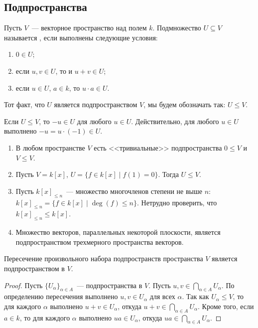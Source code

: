 \subsection{Подпространства}

\begin{definition}
Пусть $V$~--- векторное пространство над полем $k$.
Подмножество $U\subseteq V$ называется
, если выполнены следующие условия:
\begin{enumerate}
\item $0\in U$;
\item если $u,v\in U$, то и $u+v\in U$;
\item если $u\in U$, $a\in k$, то $u\cdot a\in U$.
\end{enumerate}
Тот факт, что $U$ является подпространством $V$, мы будем обозначать
так: $U\leq V$.
\end{definition}

\begin{remark}
Если $U\leq V$, то $-u\in U$ для любого $u\in
U$. Действительно, для любого $u\in U$
выполнено $-u = u\cdot (-1)\in U$.
\end{remark}

\begin{examples}
\begin{enumerate}
\item В любом пространстве $V$ есть <<тривиальные>> подпространства
  $0\leq V$ и $V\leq V$.
\item Пусть $V = k[x]$, $U = \{f\in k[x]\mid f(1) = 0\}$. Тогда
$U\leq V$.
\item Пусть $k[x]_{\leq n}$~--- множество многочленов степени не выше
  $n$: $k[x]_{\leq n}=\{f\in k[x]\mid \deg(f)\leq n\}$. Нетрудно
  проверить, что $k[x]_{\leq n}\leq k[x]$.
\item Множество векторов, параллельных некоторой плоскости, является
  подпространством трехмерного пространства векторов.
\end{enumerate}
\end{examples}

\begin{lemma}
Пересечение произвольного набора подпространств пространства $V$
является подпространством в $V$. 
\end{lemma}
\begin{proof}
Пусть $\{U_\alpha\}_{\alpha\in A}$~--- подпространства в
$V$. Пусть $u,v\in\bigcap_{\alpha\in A}U_\alpha$. По определению
пересечения выполнено $u,v\in U_\alpha$ для всех $\alpha$. Так как
$U_\alpha\leq V$, то для каждого $\alpha$ выполнено $u+v\in U_\alpha$,
откуда $u+v\in\bigcap_{\alpha\in A}U_\alpha$. Кроме того, если
$a\in k$, то для каждого $\alpha$ выполнено $ua\in
U_\alpha$, откуда $ua\in\bigcap_{\alpha\in A}U_\alpha$.
\end{proof}

